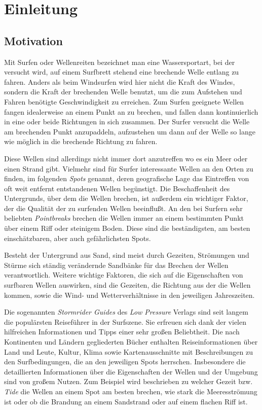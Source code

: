 
\chapter{Einleitung}

\section{Motivation}

Mit Surfen oder Wellenreiten bezeichnet man eine Wassersportart, bei
der versucht wird, auf einem Surfbrett stehend eine brechende Welle
entlang zu fahren. Anders als beim Windsurfen wird hier nicht die
Kraft des Windes, sondern die Kraft der brechenden Welle benutzt, um
die zum Aufstehen und Fahren benötigte Geschwindigkeit zu
erreichen. Zum Surfen geeignete Wellen fangen idealerweise an einem
Punkt an zu brechen, und fallen dann kontinuierlich in eine oder beide
Richtungen in sich zusammen. Der Surfer versucht die Welle am
brechenden Punkt anzupaddeln, aufzustehen um dann auf der Welle so
lange wie möglich in die brechende Richtung zu fahren.

Diese Wellen sind allerdings nicht immer dort anzutreffen wo es ein
Meer oder einen Strand gibt. Vielmehr sind für Surfer interessante
Wellen an den Orten zu finden, im folgenden \textit{Spots} genannt,
deren geografische Lage das Eintreffen von oft weit entfernt
entstandenen Wellen begünstigt. Die Beschaffenheit des Untergrunds,
über dem die Wellen brechen, ist außerdem ein wichtiger Faktor, der
die Qualität der zu surfenden Wellen beeinflußt. An den bei Surfern
sehr beliebten \textit{Pointbreaks} brechen die Wellen immer an einem
bestimmten Punkt über einem Riff oder steinigem Boden. Diese sind die
beständigsten, am besten einschätzbaren, aber auch gefährlichsten
Spots.

Besteht der Untergrund aus Sand, sind meist durch Gezeiten, Strömungen
und Stürme sich ständig verändernde Sandbänke für das Brechen der
Wellen verantwortlich. Weitere wichtige Faktoren, die sich auf die
Eigenschaften von surfbaren Wellen auswirken, sind die Gezeiten, die
Richtung aus der die Wellen kommen, sowie die Wind- und
Wetterverhältnisse in den jeweiligen Jahreszeiten.

Die sogenannten \textit{Stormrider Guides} des \textit{Low Pressure}
Verlags sind seit langem die populärsten Reiseführer in der
Surfszene. Sie erfreuen sich dank der vielen hilfreichen Informationen
und Tipps einer sehr großen Beliebtheit. Die nach Kontinenten und
Ländern gegliederten Bücher enthalten Reiseinformationen über Land und
Leute, Kultur, Klima sowie Kartenausschnitte mit Beschreibungen zu den
Surfbedingungen, die an den jeweiligen Spots herrschen. Insbesondere
die detaillierten Informationen über die Eigenschaften der Wellen und
der Umgebung sind von großem Nutzen. Zum Beispiel wird beschrieben zu
welcher Gezeit bzw. \textit{Tide} die Wellen an einem Spot am besten brechen,
wie stark die Meeresströmung ist oder ob die Brandung an einem
Sandstrand oder auf einem flachen Riff ist.

